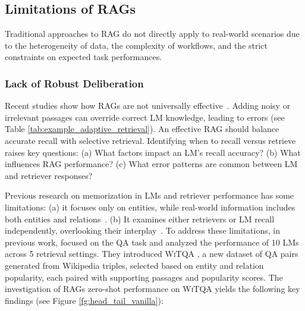 \subsection{Limitations of RAGs}

Traditional approaches to RAG do not directly apply to real-world scenarios due to the heterogeneity of data, the complexity of workflows, and the strict constraints on expected task performances.

\subsubsection{Lack of Robust Deliberation}



Recent studies show how RAGs are not universally effective~\cite{petroni-2020,li-etal-2023-large}. Adding noisy or irrelevant passages can override correct LM knowledge, leading to errors (see Table \ref{tab:example_adaptive_retrieval}). An effective RAG should balance accurate recall with selective retrieval. Identifying when to recall versus retrieve raises key questions: (a) What factors impact an LM’s recall accuracy? (b) What influences RAG performance? (c) What error patterns are common between LM and retriever responses?


Previous research on memorization in LMs and retriever performance has some limitations: (a) it focuses only on entities, while real-world information includes both entities and relations~\cite{sun2023headtotail,mallen-etal-2023-trust}. (b) It examines either retrievers or LM recall independently, overlooking their interplay~\cite{petroni-etal-2019-language, sciavolino-etal-2021-simple,liu2023pre}. To address these limitations, in previous work, \cite{maekawa-etal-2024-retrieval} focused on the QA task and analyzed the performance of 10 LMs across 5 retrieval settings. They introduced \textsc{WiTQA} \cite{maekawa-etal-2024-retrieval}, a new dataset of QA pairs generated from Wikipedia triples, selected based on entity and relation popularity, each paired with supporting passages and popularity scores. The investigation of RAGs zero-shot performance on \textsc{WiTQA} yields the following key findings (see Figure \ref{fg:head_tail_vanilla}):

